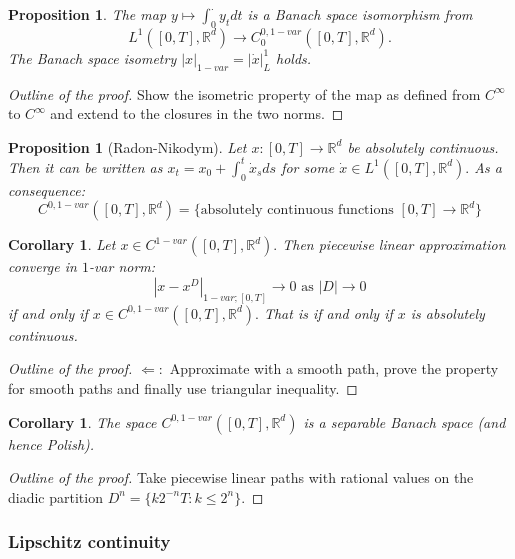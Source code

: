 \documentclass{article}
\newcommand{\R}{\mathbb{R}}
\newtheorem{prop}[theorem]{Proposition}
\newtheorem{corollary}[theorem]{Corollary}
\begin{document}
\begin{prop}\label{theo:1varL1}
    The map $y \mapsto \int_0^{\cdot} y_t dt$ is a Banach space isomorphism from 
    \begin{equation}
        L^1([0,T], \R^d) \rightarrow C_0^{0,1-var}([0,T], \R^d).
    \end{equation}
    The Banach space isometry $|x|_{1-var} = |\dot{x}|_L^1$ holds.
\end{prop}
\begin{proof}[Outline of the proof]
    Show the isometric property of the map as defined from $C^{\infty}$ to $C^{\infty}$ and extend to the closures in the two norms. 
\end{proof}
\begin{prop}[Radon-Nikodym]
Let $x: [0,T] \rightarrow \R^d$ be absolutely continuous. Then it can be written as $x_t = x_0 + \int_0^t \dot{x}_s ds$ for some $\dot{x} \in L^1([0,T], \R^d).$ As a consequence:
\begin{equation}
    C^{0,1-var}([0,T], \R^d) = \{ \text{absolutely continuous functions } [0,T] \rightarrow \R^d \}
\end{equation}
\end{prop}

\begin{corollary}
    Let $x \in C^{1-var}([0,T], \R^d).$ Then piecewise linear approximation converge in $1$-var norm:
    \begin{equation}
        |x - x^D|_{1-var; [0,T]} \rightarrow 0 \text{ as } |D| \rightarrow 0
    \end{equation}
    if and only if $x \in C^{0, 1-var}([0,T], \R^d).$ That is if and only if $x$ is absolutely continuous.
\end{corollary}
\begin{proof}[Outline of the proof]
    $\Leftarrow:$ Approximate  with a smooth path, prove the property for smooth paths and finally use triangular inequality.
\end{proof}

\begin{corollary}
 The space $C^{0,1-var}([0,T],\R^d)$ is a separable Banach space (and hence Polish).    
\end{corollary}
\begin{proof}[Outline of the proof]
    Take piecewise linear paths with rational values on the diadic partition $D^n = \{ k 2^{-n}T: k \leq 2^n \}.$
\end{proof}

\subsubsection{Lipschitz continuity}
\end{document}
